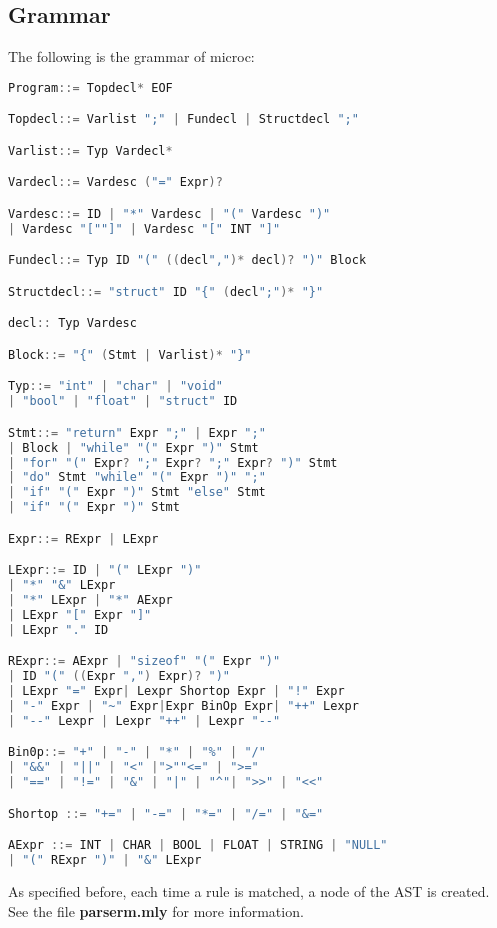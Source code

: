 \documentclass{article}
\begin{document}
\subsection{Grammar}
The following is the grammar of microc:
\begin{lstlisting}[language=C, basicstyle=\ttfamily\fontsize{8pt}{14pt}, keywordstyle=\color{blue}, commentstyle=\color{green}]
Program::= Topdecl* EOF

Topdecl::= Varlist ";" | Fundecl | Structdecl ";"

Varlist::= Typ Vardecl*

Vardecl::= Vardesc ("=" Expr)?

Vardesc::= ID | "*" Vardesc | "(" Vardesc ")"
| Vardesc "[""]" | Vardesc "[" INT "]"

Fundecl::= Typ ID "(" ((decl",")* decl)? ")" Block

Structdecl::= "struct" ID "{" (decl";")* "}"

decl:: Typ Vardesc

Block::= "{" (Stmt | Varlist)* "}"

Typ::= "int" | "char" | "void"
| "bool" | "float" | "struct" ID

Stmt::= "return" Expr ";" | Expr ";"
| Block | "while" "(" Expr ")" Stmt
| "for" "(" Expr? ";" Expr? ";" Expr? ")" Stmt
| "do" Stmt "while" "(" Expr ")" ";"
| "if" "(" Expr ")" Stmt "else" Stmt
| "if" "(" Expr ")" Stmt

Expr::= RExpr | LExpr

LExpr::= ID | "(" LExpr ")"
| "*" "&" LExpr
| "*" LExpr | "*" AExpr
| LExpr "[" Expr "]"
| LExpr "." ID

RExpr::= AExpr | "sizeof" "(" Expr ")"
| ID "(" ((Expr ",") Expr)? ")"
| LExpr "=" Expr| Lexpr Shortop Expr | "!" Expr
| "-" Expr | "~" Expr|Expr BinOp Expr| "++" Lexpr
| "--" Lexpr | Lexpr "++" | Lexpr "--"

Bin0p::= "+" | "-" | "*" | "%" | "/"
| "&&" | "||" | "<" |">""<=" | ">="
| "==" | "!=" | "&" | "|" | "^"| ">>" | "<<"

Shortop ::= "+=" | "-=" | "*=" | "/=" | "&="

AExpr ::= INT | CHAR | BOOL | FLOAT | STRING | "NULL"
| "(" RExpr ")" | "&" LExpr
\end{lstlisting}
As specified before, each time a rule is matched, a node of the AST is created. See the file \textbf{parserm.mly} for more information.
\end{document}
